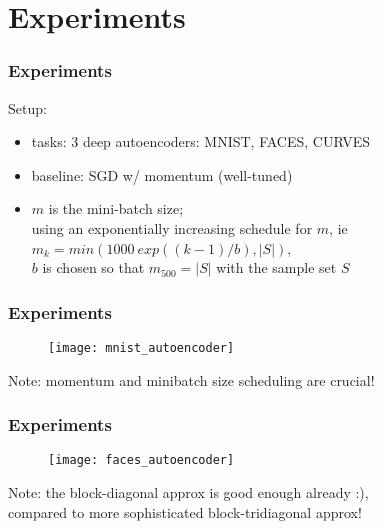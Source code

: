 \section{Experiments}

\begin{frame}
\frametitle{Experiments}
Setup:
\begin{itemize}
    \item tasks: 3 deep autoencoders: MNIST, FACES, CURVES
    \item baseline: SGD w/ momentum (well-tuned)
    \item $m$ is the mini-batch size;\\
          using an exponentially increasing schedule for $m$, ie
          $m_k = min(1000~exp((k - 1)/b), |S|)$,\\
            $b$ is chosen so that $m_{500} = |S|$ with the sample set $S$
\end{itemize}
\end{frame}

\begin{frame}
\frametitle{Experiments}
\begin{figure}
    \centering
    \texttt{[image: mnist\_autoencoder]}
\end{figure}
Note: momentum and minibatch size scheduling are crucial!
\end{frame}

\begin{frame}
\frametitle{Experiments}
\begin{figure}
    \centering
    \texttt{[image: faces\_autoencoder]}
\end{figure}
Note: the block-diagonal approx is good enough already :), \\
compared to more sophisticated block-tridiagonal approx!
\end{frame}
